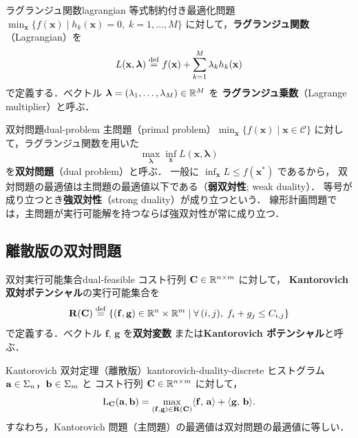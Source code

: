 \begin{definition}{ラグランジュ関数}{lagrangian}
  等式制約付き最適化問題 $\min_{\mathbf{x}} \{f(\mathbf{x}) \mid h_k(\mathbf{x}) = 0,\; k = 1, \ldots, M\}$
  に対して，\textbf{ラグランジュ関数}（Lagrangian）を
  \[
    L(\mathbf{x}, \boldsymbol{\lambda})
    \overset{\mathrm{def}}{=} f(\mathbf{x}) + \sum_{k=1}^M \lambda_k h_k(\mathbf{x})
  \]
  で定義する．ベクトル $\boldsymbol{\lambda} = (\lambda_1, \ldots, \lambda_M) \in \mathbb{R}^M$ を
  \textbf{ラグランジュ乗数}（Lagrange multiplier）と呼ぶ．
\end{definition}

\begin{definition}{双対問題}{dual-problem}
  主問題（primal problem）$\min_{\mathbf{x}} \{f(\mathbf{x}) \mid \mathbf{x} \in \mathcal{C}\}$
  に対して，ラグランジュ関数を用いた
  \[
    \max_{\boldsymbol{\lambda}} \inf_{\mathbf{x}} L(\mathbf{x}, \boldsymbol{\lambda})
  \]
  を\textbf{双対問題}（dual problem）と呼ぶ．
  一般に $\inf_{\mathbf{x}} L \leq f(\mathbf{x}^*)$ であるから，
  双対問題の最適値は主問題の最適値以下である（\textbf{弱双対性}; weak duality）．
  等号が成り立つとき\textbf{強双対性}（strong duality）が成り立つという．
  線形計画問題では，主問題が実行可能解を持つならば強双対性が常に成り立つ．
\end{definition}

\subsection{離散版の双対問題}
\label{subsec:discrete-dual}

\begin{definition}{双対実行可能集合}{dual-feasible}
  コスト行列 $\mathbf{C} \in \mathbb{R}^{n \times m}$ に対して，
  \textbf{Kantorovich 双対ポテンシャル}の実行可能集合を
  \[
    \mathbf{R}(\mathbf{C}) \overset{\mathrm{def}}{=}
    \left\{ (\mathbf{f}, \mathbf{g}) \in \mathbb{R}^n \times \mathbb{R}^m \;\middle|\;
    \forall\, (i, j), \; f_i + g_j \leq C_{i,j} \right\}
  \]
  で定義する．ベクトル $\mathbf{f}$, $\mathbf{g}$ を\textbf{双対変数}
  または\textbf{Kantorovich ポテンシャル}と呼ぶ．
\end{definition}

\begin{theorem}{Kantorovich 双対定理（離散版）}{kantorovich-duality-discrete}
  ヒストグラム $\mathbf{a} \in \Sigma_n$，$\mathbf{b} \in \Sigma_m$ と
  コスト行列 $\mathbf{C} \in \mathbb{R}^{n \times m}$ に対して，
  \[
    \mathrm{L}_{\mathbf{C}}(\mathbf{a}, \mathbf{b})
    = \max_{(\mathbf{f}, \mathbf{g}) \in \mathbf{R}(\mathbf{C})}
    \langle \mathbf{f},\, \mathbf{a} \rangle + \langle \mathbf{g},\, \mathbf{b} \rangle.
  \]
  すなわち，Kantorovich 問題（主問題）の最適値は双対問題の最適値に等しい．
\end{theorem}

